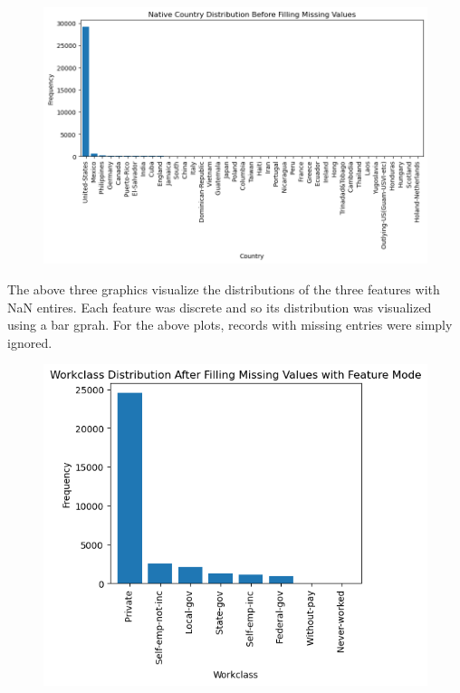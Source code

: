 \documentclass{article}
\begin{document}
    \newpage
    \begin{center}
        \begin{minipage}[t]{0.9\textwidth}
            \begin{figure}[H]
                \centering
                \includegraphics[width=1\textwidth, height=0.4\textheight]{./2_3aiii.png}
            \end{figure}
            The above three graphics visualize the distributions of the three
            features with NaN entires. Each feature was discrete and so its distribution was
            visualized using a bar gprah.
            For the above plots, records with missing entries were simply ignored.
        \end{minipage}
    \end{center}

    \begin{center}
        \begin{minipage}[t]{0.9\textwidth}
            \begin{figure}[H]
                \centering
                \includegraphics[width=1\textwidth, height=0.4\textheight]{./2_3bi.png}
            \end{figure}
        \end{minipage}
    \end{center}
\end{document}

